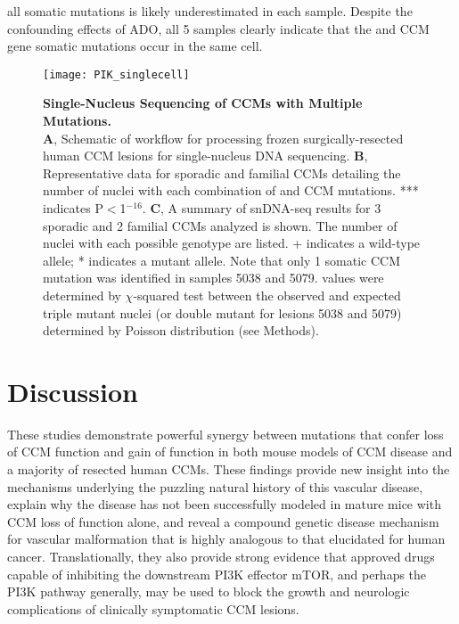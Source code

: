 all somatic mutations is likely underestimated in each sample. Despite the confounding effects of ADO, all 5 samples clearly indicate that the  and CCM gene somatic mutations occur in the same cell.

\begin{figure}[tbp!]
\begin{center}
\texttt{[image: PIK\_singlecell]}
\end{center}
\caption[Single-Nucleus Sequencing of CCMs with Three Pathogenic Mutations.] {\textbf{Single-Nucleus Sequencing of CCMs with Multiple Mutations.} \\ \textbf{A}, Schematic of workflow for processing frozen surgically-resected human CCM lesions for single-nucleus DNA sequencing. \textbf{B}, Representative data for sporadic and familial CCMs detailing the number of nuclei with each combination of  and CCM mutations. *** indicates P$<$1$^{-16}$. \textbf{C}, A summary of snDNA-seq results for 3 sporadic and 2 familial CCMs analyzed is shown. The number of nuclei with each possible genotype are listed. + indicates a wild-type allele; * indicates a mutant allele. Note that only 1 somatic CCM mutation was identified in samples 5038 and 5079.  values were determined by $\chi$-squared test between the observed and expected triple mutant nuclei (or double mutant for lesions 5038 and 5079) determined by Poisson distribution (see Methods).}

\label{PIK_singlecell}
\end{figure}

\section{Discussion}
These studies demonstrate powerful synergy between mutations that confer loss of CCM function and gain of  function in both mouse models of CCM disease and a majority of resected human CCMs. These findings provide new insight into the mechanisms underlying the puzzling natural history of this vascular disease, explain why the disease has not been successfully modeled in mature mice with CCM loss of function alone, and reveal a compound genetic disease mechanism for vascular malformation that is highly analogous to that elucidated for human cancer. Translationally, they also provide strong evidence that approved drugs capable of inhibiting the downstream PI3K effector mTOR, and perhaps the PI3K pathway generally, may be used to block the growth and neurologic complications of clinically symptomatic CCM lesions.  

